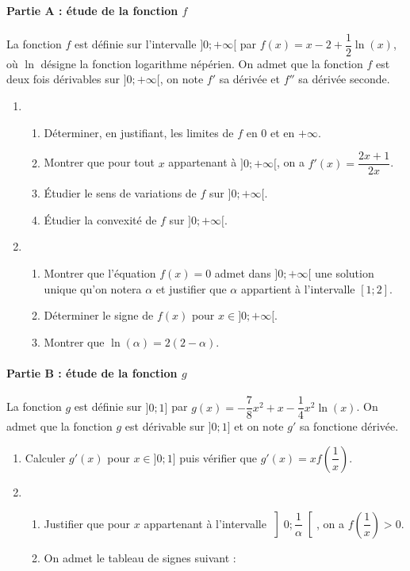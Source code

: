 \documentclass[11pt,fleqn, openany]{book} %
\begin{document}
\begin{exercise}[subtitle={(Métropole 2024)}]

\paragraph{Partie A : étude de la fonction $f$}

La fonction $f$ est définie sur l'intervalle $]0;+\infty[$ par $f(x)=x-2+\dfrac{1}{2}\ln (x)$, où $\ln$ désigne la fonction logarithme népérien. On admet que la fonction $f$ est deux fois dérivables sur $]0;+\infty[$, on note $f'$ sa dérivée et $f''$ sa dérivée seconde.

\begin{enumerate}
\item \begin{enumerate}
\item Déterminer, en justifiant, les limites de $f$ en 0 et en $+\infty$.
\item Montrer que pour tout $x$ appartenant à $]0;+\infty [$, on a $f'(x)=\dfrac{2x+1}{2x}$.
\item Étudier le sens de variations de $f$ sur $]0;+\infty[$.
\item Étudier la convexité de $f$ sur $]0 ;+\infty[$.
\end{enumerate}
\item \begin{enumerate}
\item Montrer que l'équation $f(x)=0$ admet dans $]0;+\infty[$ une solution unique qu'on notera $\alpha$ et justifier que $\alpha$ appartient à l'intervalle $[1;2]$.
\item Déterminer le signe de $f(x)$ pour $x\in ]0;+\infty[$.
\item Montrer que $\ln(\alpha)=2(2-\alpha)$.
\end{enumerate}\end{enumerate}

\paragraph{Partie B : étude de la fonction $g$}

La fonction $g$ est définie sur $]0;1]$ par $g(x)=-\dfrac{7}{8}x^2+x-\dfrac{1}{4}x^2\ln(x)$. On admet que la fonction $g$ est dérivable sur $]0;1]$ et on note $g'$ sa fonctione dérivée.

\begin{enumerate}
\item Calculer $g'(x)$ pour $x\in ]0;1]$ puis vérifier que $g'(x)=xf\left(\dfrac{1}{x}\right)$.
\item \begin{enumerate}
\item Justifier que pour $x$ appartenant à l'intervalle $ \left] 0 ; \dfrac{1}{\alpha} \right[$, on a $f\left(\dfrac{1}{x}\right)>0$.
\item On admet le tableau de signes suivant :


\end{enumerate}
\end{enumerate}
\end{exercise}
\end{document}
